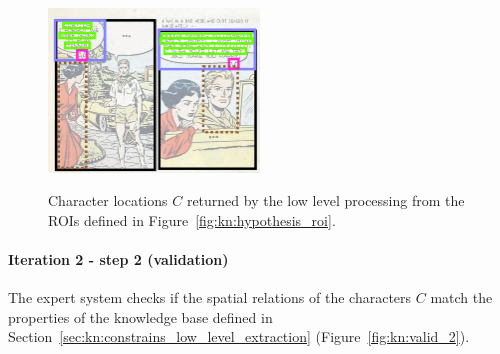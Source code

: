  \begin{figure}[!ht]  %
   \centering
   \includegraphics[trim= 0px 0px 0px 0px, clip, width=0.5\textwidth]{process_illustration_hypo_2_2.png}\\
  \caption[Character locations $C$ returned by the low level processing]{Character locations $C$ returned by the low level processing from the ROIs defined in Figure~\ref{fig:kn:hypothesis_roi}.
  }%
  \label{fig:kn:graph_character_region}
 \end{figure}

\paragraph{Iteration 2 - step 2 (validation)} %
\label{par:step_5}
The expert system checks if the spatial relations of the characters $C$ match the properties of the knowledge base defined in Section~\ref{sec:kn:constrains_low_level_extraction} (Figure~\ref{fig:kn:valid_2}).


